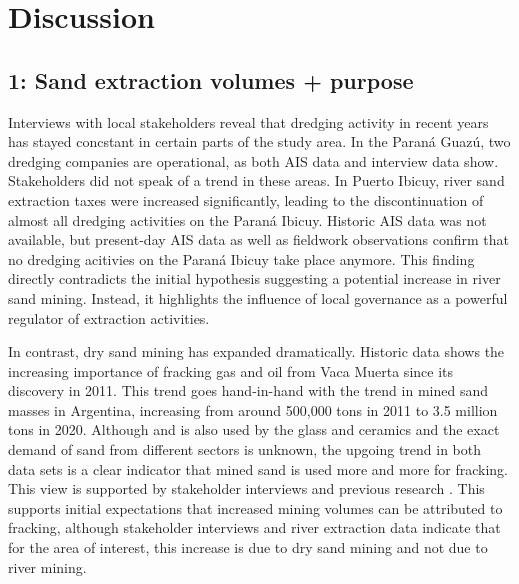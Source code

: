 \chapter{Discussion}

\section{1: Sand extraction volumes + purpose}
Interviews with local stakeholders reveal that dredging activity in recent years has stayed concstant in certain parts of the study area. In the Paraná Guazú, two dredging companies are operational, as both AIS data and interview data show. Stakeholders did not speak of a trend in these areas. In Puerto Ibicuy, river sand extraction taxes were increased significantly, leading to the discontinuation of almost all dredging activities on the Paraná Ibicuy. Historic AIS data was not available, but present-day AIS data as well as fieldwork observations confirm that no dredging acitivies on the Paraná Ibicuy take place anymore. This finding directly contradicts the initial hypothesis suggesting a potential increase in river sand mining. Instead, it highlights the influence of local governance as a powerful regulator of extraction activities.

In contrast, dry sand mining has expanded dramatically. Historic data shows the increasing importance of fracking gas and oil from Vaca Muerta since its discovery in 2011. This trend goes hand-in-hand with the trend in mined sand masses in Argentina, increasing from around 500,000 tons in 2011 to 3.5 million tons in 2020. Although and is also used by the glass and ceramics and the exact demand of sand from different sectors is unknown, the upgoing trend in both data sets is a clear indicator that mined sand is used more and more for fracking. This view is supported by stakeholder interviews and previous research \autocite{fogliaSedArena2023} \autocite{secretariadepoliticamineraArenasParaFracking2019}. This supports initial expectations that increased mining volumes can be attributed to fracking, although stakeholder interviews and river extraction data indicate that for the area of interest, this increase is due to dry sand mining and not due to river mining.

